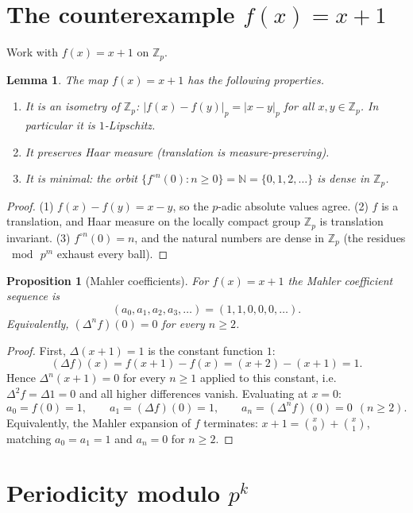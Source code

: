 \documentclass[11pt]{article}
\newtheorem{proposition}[theorem]{Proposition}
\newtheorem{lemma}[theorem]{Lemma}
\theoremstyle{definition}
\newcommand{\Zp}{\mathbb{Z}_p}
\newcommand{\D}{\Delta}
\begin{document}
\section{The counterexample $f(x)=x+1$}

Work with $f(x) = x+1$ on $\Zp$.

\begin{lemma}\label{lem:properties}
The map $f(x)=x+1$ has the following properties.
\begin{enumerate}
  \item It is an isometry of $\Zp$: $|f(x)-f(y)|_p = |x-y|_p$ for all
        $x,y \in \Zp$. In particular it is $1$-Lipschitz.
  \item It preserves Haar measure (translation is measure-preserving).
  \item It is minimal: the orbit $\{f^{\circ n}(0) : n \ge 0\} = \mathbb{N}
        = \{0,1,2,\dots\}$ is dense in $\Zp$.
\end{enumerate}
\end{lemma}

\begin{proof}
(1) $f(x)-f(y) = x-y$, so the $p$-adic absolute values agree. (2) $f$ is a
translation, and Haar measure on the locally compact group $\Zp$ is translation
invariant. (3) $f^{\circ n}(0) = n$, and the natural numbers are dense in
$\Zp$ (the residues $\bmod\,p^m$ exhaust every ball).
\end{proof}

\begin{proposition}[Mahler coefficients]\label{prop:coeffs}
For $f(x)=x+1$ the Mahler coefficient sequence is
\[
  (a_0,a_1,a_2,a_3,\dots) = (1,1,0,0,0,\dots).
\]
Equivalently, $(\D^n f)(0) = 0$ for every $n \ge 2$.
\end{proposition}

\begin{proof}
First, $\D(x+1) = 1$ is the constant function $1$:
\[
  (\D f)(x) = f(x+1)-f(x) = (x+2)-(x+1) = 1 .
\]
Hence $\D^n(x+1) = 0$ for every $n \ge 1$ applied to this constant, i.e.
$\D^2 f = \D 1 = 0$ and all higher differences vanish. Evaluating at $x=0$:
\[
  a_0 = f(0) = 1, \qquad a_1 = (\D f)(0) = 1, \qquad
  a_n = (\D^n f)(0) = 0 \ \ (n\ge 2).
\]
Equivalently, the Mahler expansion of $f$ terminates:
$x+1 = \binom{x}{0} + \binom{x}{1}$, matching $a_0=a_1=1$ and $a_n=0$ for
$n\ge 2$.
\end{proof}

\section{Periodicity modulo $p^k$}
\end{document}
